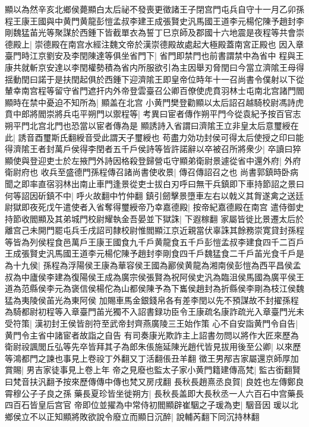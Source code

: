 顯以為然辛亥北鄉侯薨顯白太后祕不發喪更徵諸王子閉宫門屯兵自守十一月乙卯孫程王康王國與中黄門黄龍彭愷孟叔李建王成張賢史汎馬國王道李元楊佗陳予趙封李剛魏猛苖光等聚謀於西鍾下皆截單衣為誓丁巳京師及郡國十六地震是夜程等共會崇德殿上|{
	崇德殿在南宫水經注魏文帝於漢崇德殿故處起大極殿蓋南宮正殿也}
因入章臺門時江京劉安及李閏陳達等俱坐省門下|{
	省門即禁門也前書謂禁中為省中}
程與王康共就斬京安達以李閏權勢積為省内所服欲引為主因舉刃脅閏曰今當立濟隂王母得揺動閏曰諾于是扶閏起俱於西鍾下迎濟隂王即皇帝位時年十一召尚書令僕射以下從輦幸南宫程等留守省門遮扞内外帝登雲臺召公卿百僚使虎賁羽林士屯南北宫諸門閻顯時在禁中憂迫不知所為|{
	顯盖在北宫}
小黄門樊登勸顯以太后詔召越騎校尉馮詩虎賁中郎將閻崇將兵屯平朔門以禦程等|{
	考異曰宦者傳作朔平門今從袁紀予按百官志朔平門北宫北門也恐當以宦者傳為是}
顯誘詩入省謂曰濟隂王立非皇太后意璽綬在此|{
	誘音酉璽斯氏翻綬音受此謂天子璽綬也}
苟盡力効功封侯可得太后使授之印曰能得濟隂王者封萬戶侯得李閏者五千戶侯詩等皆許諾辭以卒被召所將衆少|{
	卒讀曰猝}
顯使與登迎吏士於左掖門外詩因格殺登歸營屯守顯弟衛尉景遽從省中還外府|{
	外府衛尉府也}
收兵至盛德門孫程傳召諸尚書使收景|{
	傳召傳詔召之也}
尚書郭鎮時卧病聞之即率直宿羽林出南止車門逢景從吏士拔白刃呼曰無干兵鎮即下車持節詔之景曰何等詔因斫鎮不中|{
	呼火故翻中竹仲翻}
鎮引劒擊景墮車左右以戟义其胷遂禽之送廷尉獄即夜死戊午遣使者入省奪得璽綬帝乃幸嘉德殿|{
	按帝紀嘉德殿在南宫}
遣侍御史持節收閻顯及其弟城門校尉耀執金吾晏並下獄誅|{
	下遐稼翻}
家屬皆徙比景遷太后於離宫己未開門罷屯兵壬戌詔司隸校尉惟閻顯江京近親當伏辜誅其餘務崇寛貸封孫程等皆為列侯程食邑萬戶王康王國食九千戶黄龍食五千戶彭愷孟叔李建食四千二百戶王成張賢史汎馬國王道李元楊佗陳予趙封李剛食四千戶魏猛食二千戶苖光食千戶是為十九侯|{
	孫程為浮陽侯王康為華容侯王國為酈侯黄龍為湘南侯彭愷為西平昌侯孟叔為中廬侯李建為復陽侯王成為廣宗侯張賢為祝阿侯史汎為臨沮侯馬國為廣平侯王道為范縣侯李元為褒信侯楊佗為山都侯陳予為下巂侯趙封為折縣侯李剛為枝江侯魏猛為夷陵侯苖光為東阿侯}
加賜車馬金銀錢帛各有差李閏以先不預謀故不封擢孫程為騎都尉初程等入章臺門苖光獨不入詔書録功臣令王康疏名康詐疏光入章臺門光未受符策|{
	漢初封王侯皆剖符至武帝封齊燕廣陵三王始作策}
心不自安詣黄門令自告|{
	黄門令主省中諸宦者故詣之自告}
有司奏康光欺詐主上詔書勿問以將作大匠來歷為衛尉祋諷閭丘弘等先卒皆拜其子為郎朱倀施延陳光趙代皆見拔用後至公卿|{
	以來歷等鴻都門之諫也事見上卷祋丁外翻又丁活翻倀丑羊翻}
徵王男邴吉家屬還京師厚加賞賜|{
	男吉家徒事見上卷上年}
帝之見廢也監太子家小黄門籍建傳高梵|{
	監古銜翻賢曰梵音扶汎翻予按來歷傳傳中傳也梵又房戌翻}
長秋長趙熹丞良賀|{
	良姓也左傳鄭良霄穆公子子良之孫}
藥長夏珍皆坐徙朔方|{
	長秋長盖即大長秋丞一人六百石中宫藥長四百石皆皇后宫官}
帝即位並擢為中常侍初閻顯辟崔駰之子瑗為吏|{
	駰音因}
瑗以北鄉侯立不以正知顯將敗欲說令廢立而顯日沉醉|{
	說輔芮翻下同沉持林翻}
